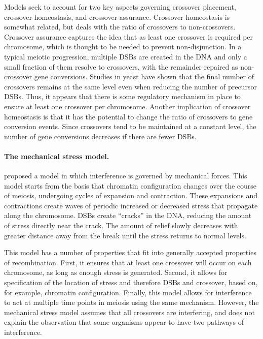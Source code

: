 Models seek to account for two key aspects governing crossover placement, crossover homeostasis, and crossover assurance.
Crossover homeostasis is somewhat related, but deals with the ratio of crossovers to non-crossovers.
Crossover assurance captures the idea that as least one crossover is required per chromosome, which is thought to be needed to prevent non-disjunction.
In a typical meiotic progression, multiple DSBs are created in the DNA and only a small fraction of them resolve to crossovers, with the remainder repaired as non-crossover gene conversions.
Studies in yeast have shown that the final number of crossovers remains at the same level even when reducing the number of precursor DSBs\cite{Martini2006}.
Thus, it appears that there is some regulatory mechanism in place to ensure at least one crossover per chromosome.
Another implication of crossover homeostasis is that it has the potential to change the ratio of crossovers to gene conversion events.
Since crossovers tend to be maintained at a constant level, the number of gene conversions decreases if there are fewer DSBs.


\paragraph{The mechanical stress model.}
\citet{Kleckner2004} proposed a model in which interference is governed by mechanical forces.
This model starts from the basis that chromatin configuration changes over the course of meiosis, undergoing cycles of expansion and contraction.
These expansions and contractions create waves of periodic increased or decreased stress that propagate along the chromosome.
DSBs create ``cracks'' in the DNA, reducing the amount of stress directly near the crack.
The amount of relief slowly decreases with greater distance away from the break until the stress returns to normal levels.

This model has a number of properties that fit into generally accepted properties of recombination.
First, it ensures that at least one crossover will occur on each chromosome, as long as enough stress is generated.
Second, it allows for specification of the location of stress and therefore DSBs and crossover, based on, for example, chromatin configuration.
Finally, this model allows for interference to act at multiple time points in meiosis using the same mechanism.
However, the mechanical stress model assumes that all crossovers are interfering, and does not explain the observation that some organisms appear to have two pathways of interference.

